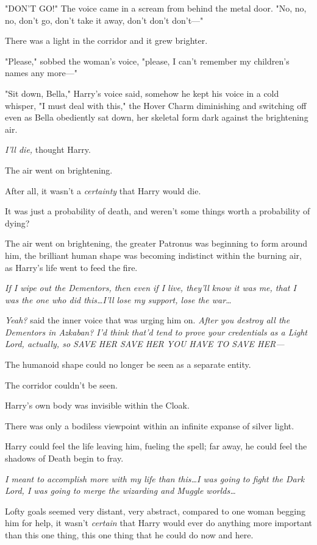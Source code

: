 "DON'T GO!" The voice came in a scream from behind the metal door. "No, no, no,
don't go, don't take it away, don't don't don't—"

There was a light in the corridor and it grew brighter.

"Please," sobbed the woman's voice, "please, I can't remember my children's
names any more—"

"Sit down, Bella," Harry's voice said, somehow he kept his voice in a cold
whisper, "I must deal with this," the Hover Charm diminishing and switching off
even as Bella obediently sat down, her skeletal form dark against the
brightening air.

\emph{I'll die,} thought Harry.

The air went on brightening.

After all, it wasn't a \emph{certainty} that Harry would die.

It was just a probability of death, and weren't some things worth a probability
of dying?

The air went on brightening, the greater Patronus was beginning to form around
him, the brilliant human shape was becoming indistinct within the burning air,
as Harry's life went to feed the fire.

\emph{If I wipe out the Dementors, then even if I live, they'll know it was me,
that I was the one who did this…I'll lose my support, lose the
war…}

\emph{Yeah?} said the inner voice that was urging him on. \emph{After you
destroy all the Dementors in Azkaban? I'd think that'd tend to prove your
credentials as a Light Lord, actually, so SAVE HER SAVE HER YOU HAVE TO SAVE
HER—}

The humanoid shape could no longer be seen as a separate entity.

The corridor couldn't be seen.

Harry's own body was invisible within the Cloak.

There was only a bodiless viewpoint within an infinite expanse of silver light.

Harry could feel the life leaving him, fueling the spell; far away, he could
feel the shadows of Death begin to fray.

\emph{I meant to accomplish more with my life than this…I was going to
fight the Dark Lord, I was going to merge the wizarding and Muggle
worlds…}

Lofty goals seemed very distant, very abstract, compared to one woman begging
him for help, it wasn't \emph{certain} that Harry would ever do anything more
important than this one thing, this one thing that he could do now and here.

